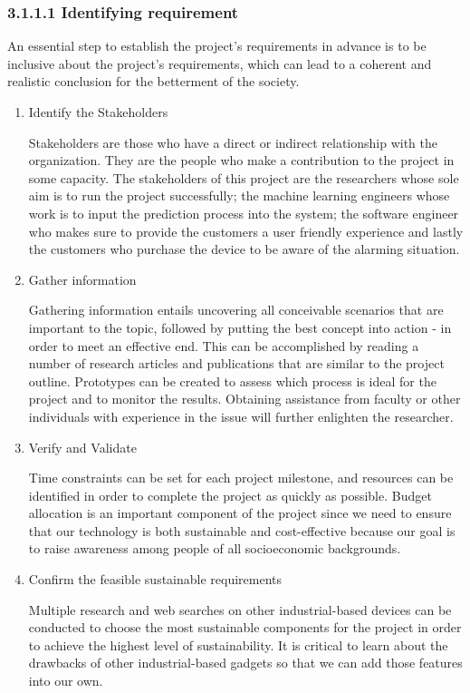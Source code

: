 \subsubsection{3.1.1.1  Identifying requirement}
\vspace{0.5cm}
An essential step to establish the project's requirements in advance is to be inclusive about the project's requirements, which can lead to a coherent and realistic conclusion for the betterment of the society.
\begin{enumerate}

\item Identify the Stakeholders

Stakeholders are those who have a direct or indirect relationship with the organization. They are the people who make a contribution to the project in some capacity. The stakeholders of this project are the researchers whose sole aim is to run the project successfully; the machine learning engineers whose work is to input the prediction process into the system; the software engineer who makes sure to provide the customers a user friendly experience and lastly the customers who purchase the device to be aware of the alarming situation.

\item Gather information

Gathering information entails uncovering all conceivable scenarios that are important to the topic, followed by putting the best concept into action - in order to meet an effective end. This can be accomplished by reading a number of research articles and publications that are similar to the project outline. Prototypes can be created to assess which process is ideal for the project and to monitor the results. Obtaining assistance from faculty or other individuals with experience in the issue will further enlighten the researcher.

\item Verify and Validate

Time constraints can be set for each project milestone, and resources can be identified in order to complete the project as quickly as possible. Budget allocation is an important component of the project since we need to ensure that our technology is both sustainable and cost-effective because our goal is to raise awareness among people of all socioeconomic backgrounds.

\item Confirm the feasible sustainable requirements 

Multiple research and web searches on other industrial-based devices can be conducted to choose the most sustainable components for the project in order to achieve the highest level of sustainability. It is critical to learn about the drawbacks of other industrial-based gadgets so that we can add those features into our own.
\end{enumerate}

